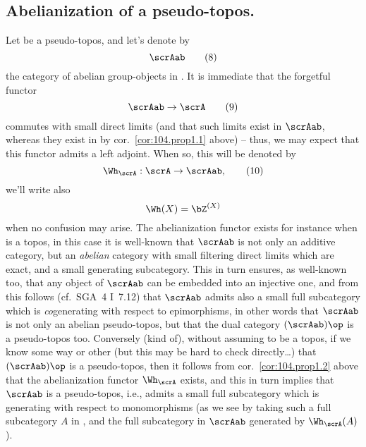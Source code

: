 \subsection{Abelianization of a pseudo-topos.}
\label{subsec:104.B}
Let \scrA{} be a pseudo-topos, and let's denote by
\begin{equation}
  \label{eq:104.8}
  \scrAab\tag{8}
\end{equation}
the category of abelian group-objects in \scrA. It is immediate that
the forgetful functor
\begin{equation}
  \label{eq:104.9}
  \scrAab\to\scrA\tag{9}
\end{equation}
commutes with small direct limits (and that such limits exist in
$\scrAab$, whereas they exist in \scrA{} by cor.\ \ref{cor:104.prop1.1}
above) -- thus, we may expect that this functor admits a left
adjoint. When so, this will be denoted by
\begin{equation}
  \label{eq:104.10}
  \Wh_\scrA : \scrA\to\scrAab,\tag{10}
\end{equation}
we'll write also
\[\Wh(X)=\bZ^{(X)}\]
when no confusion may arise. The abelianization functor exists for
instance when \scrA{} is a topos, in this case it is well-known that
$\scrAab$ is not only an additive category, but an \emph{abelian}
category with small filtering direct limits which are exact, and a
small generating subcategory. This in turn ensures, as well-known too,
that any object of $\scrAab$ can be embedded into an injective one,
and from this follows (cf.\ SGA~4
I~7.12) that $\scrAab$ admits also a
small full subcategory which is \emph{co}generating with respect to
epimorphisms, in other words that $\scrAab$ is not only an abelian
pseudo-topos, but that the dual category $(\scrAab)\op$ is a
pseudo-topos too. Conversely (kind of), without assuming \scrA{} to be
a topos, if we know some way or other (but this may be hard to check
directly\ldots) that $(\scrAab)\op$ is a pseudo-topos, then it follows
from cor.\ \ref{cor:104.prop1.2} above that the abelianization functor
$\Wh_\scrA$ exists, and this in turn implies that $\scrAab$ is a
pseudo-topos, i.e., admits a small full subcategory which is
generating with respect to monomorphisms (as we see by taking such a
full subcategory $A$ in \scrA, and the full subcategory in
$\scrAab$ generated by $\Wh_\scrA(A)$).

